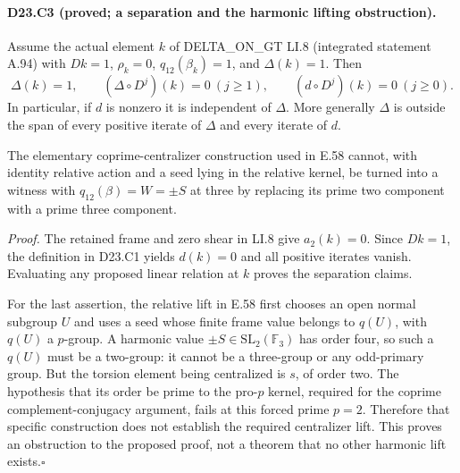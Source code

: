 \paragraph{D23.C3 (proved; a separation and the harmonic lifting obstruction).}
Assume the actual element $k$ of DELTA\_ON\_GT LI.8
(integrated statement A.94) with
$Dk=1$, $\rho_k=0$, $q_{12}(\beta_k)=1$, and $\Delta(k)=1$.
Then
\[
 \Delta(k)=1,\qquad
 (\Delta\circ D^j)(k)=0\ (j\geq1),\qquad
 (d\circ D^j)(k)=0\ (j\geq0).
\]
In particular, if $d$ is nonzero it is independent of $\Delta$.
More generally $\Delta$ is outside the span of every positive
iterate of $\Delta$ and every iterate of $d$.

The elementary coprime-centralizer construction used in E.58
cannot, with identity relative action and a seed lying in the
relative kernel, be turned into a witness with
$q_{12}(\beta)=W=\pm S$ at three by replacing its prime two
component with a prime three component.

\emph{Proof.}
The retained frame and zero shear in LI.8 give $a_2(k)=0$.
Since $Dk=1$, the definition in D23.C1 yields $d(k)=0$ and
all positive iterates vanish.  Evaluating any proposed linear
relation at $k$ proves the separation claims.

For the last assertion, the relative lift in E.58 first chooses an
open normal subgroup $U$ and uses a seed whose finite frame value
belongs to $q(U)$, with $q(U)$ a $p$-group.  A harmonic value
$\pm S\in\mathrm{SL}_2(\mathbb F_3)$ has order four, so such
a $q(U)$ must be a two-group: it cannot be a three-group or any
odd-primary group.  But the torsion element being centralized is
$s$, of order two.  The hypothesis that its order be prime to the
pro-$p$ kernel, required for the coprime complement-conjugacy
argument, fails at this forced prime $p=2$.  Therefore that specific
construction does not establish the required centralizer lift.
This proves an obstruction to the proposed proof, not a theorem
that no other harmonic lift exists.\hfill$\square$
